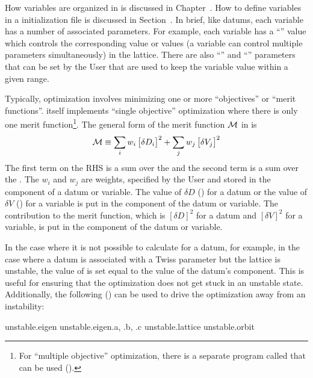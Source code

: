 How variables are organized in \tao is discussed in Chapter~. How to define variables in
a \tao initialization file is discussed in Section~. In brief, like datums, each
variable has a number of associated parameters. For example, each variable has a ``''
value which controls the corresponding value or values (a variable can control multiple parameters
simultaneously) in the  lattice. There are also ``'' and ``''
parameters that can be set by the User that are used to keep the variable  value within a
given range.

Typically, optimization involves minimizing one or more ``objectives'' or ``merit functions''. \tao
itself implements ``single objective'' optimization where there is only one merit
function\footnote{For ``multiple objective'' optimization, there is a separate program called
 that can be used ().}. The general form of the merit function $\cal M$ in \tao
is
\begin{equation}
  {\cal M} \equiv 
    \sum_{i} w_i \, \bigl[ \delta D_i \bigr]^2 + 
    \sum_{j} w_j \, \bigl[ \delta V_j \bigr]^2
  \label{m1}
\end{equation}
The first term on the RHS is a sum over the  and the second term is a sum over the
.  The $w_i$ and $w_j$ are weights, specified by the User and stored in the
 component of a datum or variable. The value of $\delta D$ () for a datum or
the value of $\delta V$ () for a variable is put in the  component of
the datum or variable. The contribution to the merit function, which is $[\delta D]^2$ for a datum
and $[\delta V]^2$ for a variable, is put in the  component of the datum or variable.

In the case where it is not possible to calculate  for a datum, for example, in the
case where a datum is associated with a Twiss parameter but the lattice is unstable, the value of
 is set equal to the value of the datum's  component. This is
useful for ensuring that the optimization does not get stuck in an unstable state. Additionally, the
following  () can be used to drive the optimization away from an
instability:
\begin{example}
  unstable.eigen
  unstable.eigen.a, .b, .c
  unstable.lattice
  unstable.orbit
\end{example}

